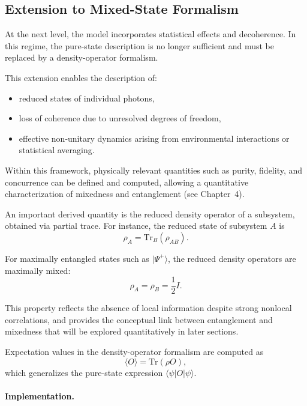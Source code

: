 \documentclass[a4paper]{article}
\begin{document}
\subsection{Extension to Mixed-State Formalism}

At the next level, the model incorporates statistical effects and decoherence. In this regime, the pure-state description is no longer sufficient and must be replaced by a density-operator formalism.

\medskip

This extension enables the description of:
\begin{itemize}
\item reduced states of individual photons,
\item loss of coherence due to unresolved degrees of freedom,
\item effective non-unitary dynamics arising from environmental interactions or statistical averaging.
\end{itemize}

\medskip

Within this framework, physically relevant quantities such as purity, fidelity, and concurrence can be defined and computed, allowing a quantitative characterization of mixedness and entanglement (see Chapter~4).

\medskip

An important derived quantity is the reduced density operator of a subsystem, obtained via partial trace. For instance, the reduced state of subsystem \( A \) is
\[
\rho_A = \mathrm{Tr}_B(\rho_{AB}).
\]

For maximally entangled states such as \( |\Psi^+\rangle \), the reduced density operators are maximally mixed:
\[
\rho_A = \rho_B = \frac{1}{2} I.
\]

\medskip

This property reflects the absence of local information despite strong nonlocal correlations, and provides the conceptual link between entanglement and mixedness that will be explored quantitatively in later sections.

\medskip

Expectation values in the density-operator formalism are computed as
\[
\langle O \rangle = \mathrm{Tr}(\rho O),
\]
which generalizes the pure-state expression \( \langle \psi | O | \psi \rangle \).

\medskip

\paragraph{Implementation.}
\end{document}
